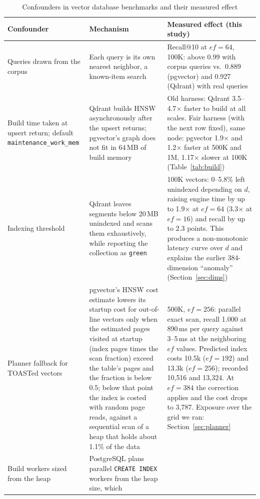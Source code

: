 \documentclass[preprint,12pt]{elsarticle}
\begin{document}
\begin{table}[t]
  \caption{Confounders in vector database benchmarks and their measured effect}
  \label{tab:confounders}
  \small
  \begin{tabular}{p{}p{}p{}}
    \toprule
    Confounder & Mechanism & Measured effect (this study) \\
    \midrule
    Queries drawn from the corpus &
      Each query is its own nearest neighbor, a known-item search &
      Recall@10 at $ef=64$, 100K: above 0.99 with corpus queries vs.\ 0.889
      (pgvector) and 0.927 (Qdrant) with real queries \\
    Build time taken at upsert return; default \texttt{maintenance\_work\_mem} &
      Qdrant builds HNSW asynchronously after the upsert returns; pgvector's graph does
      not fit in 64\,MB of build memory &
      Old harness: Qdrant 3.5--4.7$\times$ faster to build at all scales. Fair harness
      (with the next row fixed), same node: pgvector 1.9$\times$ and 1.2$\times$ faster at
      500K and 1M, 1.17$\times$ slower at 100K (Table~\ref{tab:build}) \\
    Indexing threshold &
      Qdrant leaves segments below 20\,MB unindexed and scans them exhaustively, while
      reporting the collection as \texttt{green} &
      100K vectors: 0--5.8\% left unindexed depending on $d$, raising engine time by up to
      1.9$\times$ at $ef=64$ (3.3$\times$ at $ef=16$) and recall by up to
      2.3 points. This produces a non-monotonic latency curve over $d$ and explains the
      earlier 384-dimension ``anomaly'' (Section~\ref{sec:dims}) \\
    Planner fallback for TOASTed vectors &
      pgvector's HNSW cost estimate lowers its startup cost for out-of-line vectors only when
      the estimated pages visited at startup (index pages times the scan fraction) exceed the
      table's pages and the fraction is below 0.5; below that point the index is costed
      with random page reads, against a sequential scan of a heap that holds about 1.1\%
      of the data &
      500K, $ef=256$: parallel exact scan, recall 1.000 at 890\,ms per query
      against 3--5\,ms at the neighboring $ef$ values. Predicted index costs 10.5k
      ($ef=192$) and 13.3k ($ef=256$); recorded 10{,}516 and 13{,}324. At $ef=384$ the
      correction applies and the cost drops to 3{,}787. Exposure over the grid we ran:
      Section~\ref{sec:planner} \\
    Build workers sized from the heap &
      PostgreSQL plans parallel \texttt{CREATE INDEX} workers from the heap size, which

\end{tabular}
\end{table}
\end{document}
